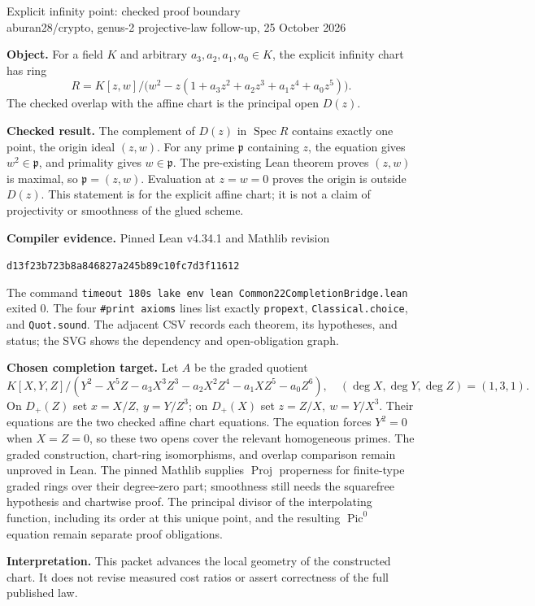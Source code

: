 \documentclass[11pt]{article}
\begin{document}
\begin{center}
{\Large Explicit infinity point: checked proof boundary}\\[4pt]
{\small aburan28/crypto, genus-2 projective-law follow-up, 25 October 2026}
\end{center}

\textbf{Object.} For a field $K$ and arbitrary $a_3,a_2,a_1,a_0\in K$, the
explicit infinity chart has ring
\[
  R=K[z,w]/\bigl(w^2-z(1+a_3z^2+a_2z^3+a_1z^4+a_0z^5)\bigr).
\]
The checked overlap with the affine chart is the principal open $D(z)$.

\textbf{Checked result.} The complement of $D(z)$ in $\operatorname{Spec}R$
contains exactly one point, the origin ideal $(z,w)$. For any prime $\mathfrak p$
containing $z$, the equation gives $w^2\in\mathfrak p$, and primality gives
$w\in\mathfrak p$. The pre-existing Lean theorem proves $(z,w)$ is maximal,
so $\mathfrak p=(z,w)$. Evaluation at $z=w=0$ proves the origin is outside
$D(z)$. This statement is for the explicit affine chart; it is not a claim
of projectivity or smoothness of the glued scheme.

\textbf{Compiler evidence.} Pinned Lean v4.34.1 and Mathlib revision
\begin{center}\small\texttt{d13f23b723b8a846827a245b89c10fc7d3f11612}\end{center}
The command
\texttt{timeout 180s lake env lean Common22CompletionBridge.lean} exited 0.
The four \texttt{\#print axioms} lines list exactly
\texttt{propext}, \texttt{Classical.choice}, and \texttt{Quot.sound}.
The adjacent CSV records each theorem, its hypotheses, and status; the SVG
shows the dependency and open-obligation graph.

\textbf{Chosen completion target.} Let $A$ be the graded quotient
\[
K[X,Y,Z]/(Y^2-X^5Z-a_3X^3Z^3-a_2X^2Z^4-a_1XZ^5-a_0Z^6),
\quad (\deg X,\deg Y,\deg Z)=(1,3,1).
\]
On $D_+(Z)$ set $x=X/Z,\ y=Y/Z^3$; on $D_+(X)$ set
$z=Z/X,\ w=Y/X^3$. Their equations are the two checked affine chart
equations. The equation forces $Y^2=0$ when $X=Z=0$, so these two opens
cover the relevant homogeneous primes. The graded construction,
chart-ring isomorphisms, and overlap comparison remain unproved in Lean.
The pinned Mathlib supplies $\operatorname{Proj}$ properness for finite-type
graded rings over their degree-zero part; smoothness still needs the
squarefree hypothesis and chartwise proof. The principal divisor of the
interpolating function, including its order at this unique point, and the
resulting $\operatorname{Pic}^0$ equation remain separate proof obligations.

\textbf{Interpretation.} This packet advances the local geometry of the
constructed chart. It does not revise measured cost ratios or assert
correctness of the full published law.
\end{document}
